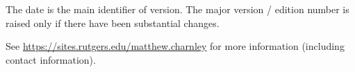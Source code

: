 \documentclass[12pt]{book}
\begin{document}
\begin{small}
\bigskip

\noindent
The date is the main identifier of version.  The major version / edition
number is raised only if there have been substantial changes.

\bigskip

\noindent
See \url{https://sites.rutgers.edu/matthew.charnley} for more information
(including contact information).

\bigskip

\end{small}

\tableofcontents

\newpage


\clearpage





















% 


% 

% 
\end{document}
